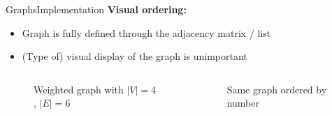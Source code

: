 
\begin{frame}{Graphs}{Implementation}
  \textbf{Visual ordering:}
  \begin{itemize}
    \item<2->
      Graph is fully defined through the
      {\color{Mittel-Blau}adjacency matrix / list}
    \item<3->
      (Type of) visual display of the graph is unimportant
  \end{itemize}
  \begin{columns}
    \begin{column}[b]{0.4\linewidth}
      \begin{figure}[!h]
        \begin{adjustbox}{width=0.8\linewidth}
          
        \end{adjustbox}
        \vspace{-0.75em}
        \caption{Weighted graph with {\color{Mittel-Blau}$\vert V \vert = 4$},
          {\color{Mittel-Blau}$\vert E \vert = 6$}}
      \end{figure}
    \end{column}
    \begin{column}[b]{0.55\linewidth}
      \begin{figure}[!h]
        \begin{adjustbox}{width=0.875\linewidth}
          
        \end{adjustbox}
        \vspace{-0.75em}
        \caption{Same graph ordered by number}
      \end{figure}
    \end{column}
  \end{columns}
\end{frame}



